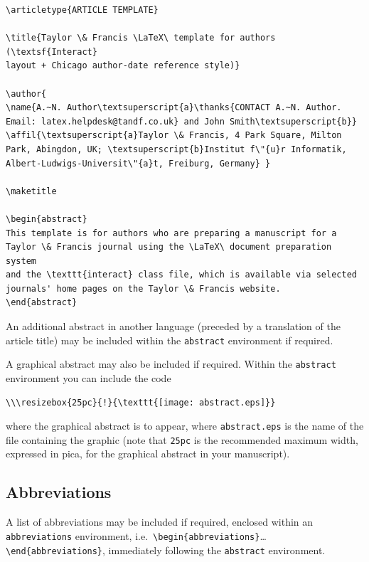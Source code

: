 \documentclass[]{interact}
\theoremstyle{plain}%
\theoremstyle{definition}
\theoremstyle{remark}
\begin{document}
\begin{verbatim}
\articletype{ARTICLE TEMPLATE}

\title{Taylor \& Francis \LaTeX\ template for authors (\textsf{Interact}
layout + Chicago author-date reference style)}

\author{
\name{A.~N. Author\textsuperscript{a}\thanks{CONTACT A.~N. Author.
Email: latex.helpdesk@tandf.co.uk} and John Smith\textsuperscript{b}}
\affil{\textsuperscript{a}Taylor \& Francis, 4 Park Square, Milton
Park, Abingdon, UK; \textsuperscript{b}Institut f\"{u}r Informatik,
Albert-Ludwigs-Universit\"{a}t, Freiburg, Germany} }

\maketitle

\begin{abstract}
This template is for authors who are preparing a manuscript for a
Taylor \& Francis journal using the \LaTeX\ document preparation system
and the \texttt{interact} class file, which is available via selected
journals' home pages on the Taylor \& Francis website.
\end{abstract}
\end{verbatim}

An additional abstract in another language (preceded by a translation of the article title) may be included within the \verb"abstract" environment if required.

A graphical abstract may also be included if required. Within the \verb"abstract" environment you can include the code
\begin{verbatim}
\\\resizebox{25pc}{!}{\texttt{[image: abstract.eps]}}
\end{verbatim}
where the graphical abstract is to appear, where \verb"abstract.eps" is the name of the file containing the graphic (note that \verb"25pc" is the recommended maximum width, expressed in pica, for the graphical abstract in your manuscript).


\subsection{Abbreviations}

A list of abbreviations may be included if required, enclosed within an \texttt{abbreviations} environment, i.e.\ \verb"\begin{abbreviations}"\ldots\verb"\end{abbreviations}", immediately following the \verb"abstract" environment.
\end{document}
